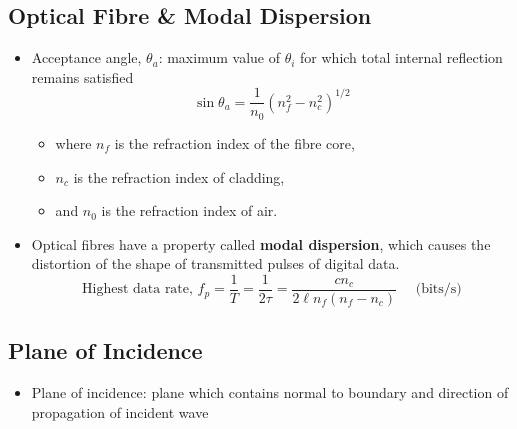 \documentclass[a4paper]{article}
\begin{document}
\subsection{Optical Fibre \& Modal Dispersion}
\begin{itemize}
    \item Acceptance angle, $\theta_a$: maximum value of $\theta_i$ for which total internal reflection remains satisfied
    $$\sin\theta_a = \frac{1}{n_0}(n_f^2-n_c^2)^{1/2}$$
    \begin{itemize}[label=$\circ$]
        \item where $n_f$ is the refraction index of the fibre core,
        \item $n_c$ is the refraction index of cladding,
        \item and $n_0$ is the refraction index of air.
    \end{itemize}
    \item Optical fibres have a property called \textbf{modal dispersion}, which causes the distortion of the shape of transmitted pulses of digital data.
    $$\text{Highest data rate, }f_p = \frac{1}{T} = \frac{1}{2\tau} = \frac{cn_c}{2\ell n_f(n_f-n_c)}\quad\text{ (bits/s)}$$
\end{itemize}


\subsection{Plane of Incidence}
\begin{itemize}
    \item Plane of incidence: plane which contains normal to boundary and direction of propagation of incident wave
\end{itemize}
\end{document}
